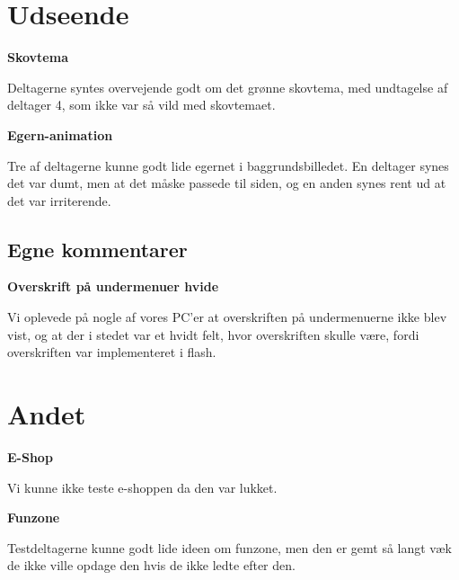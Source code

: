 \documentclass[10pt,a4paper]{article}      %
\newcommand\pic[1]{\texttt{[image: Pics/\#1]}}
\renewcommand\good{\pic{good}}
\renewcommand\smallproblem{\pic{smallproblem}}
\renewcommand\criticalproblem{\pic{criticalproblem}}
\begin{document}
\section{Udseende}
\begin{kommentarer}
  \item[\good]{\textbf{Skovtema}}
  
  Deltagerne syntes overvejende godt om det grønne skovtema, med
  undtagelse af deltager 4, som ikke var så vild med skovtemaet.

  \item[\smallproblem]{\textbf{Egern-animation}} 
  
  Tre af deltagerne kunne godt lide egernet i baggrundsbilledet. En deltager
  synes det var dumt, men at det måske passede til siden, og en anden synes rent
  ud at det var irriterende.
\end{kommentarer}

\subsection{Egne kommentarer} %
\label{sub:Egne kommentarer udseende}

\begin{kommentarer}
  \item[\smallproblem]{\textbf{Overskrift på undermenuer hvide}}

  Vi oplevede på nogle af vores PC'er at overskriften på undermenuerne ikke blev
  vist, og at der i stedet var et hvidt felt, hvor overskriften skulle være,
  fordi overskriften var implementeret i flash.
\end{kommentarer}

\section{Andet}
\begin{kommentarer}

\item[\criticalproblem]{\textbf{E-Shop}}

Vi kunne ikke teste e-shoppen da den var lukket.

\item[\smallproblem]{\textbf{Funzone}}

Testdeltagerne kunne godt lide ideen om funzone, men den er gemt så langt væk de ikke ville opdage den hvis de ikke ledte efter den.
\end{kommentarer}
\end{document}
